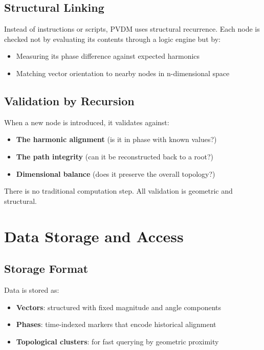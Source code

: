 \documentclass[12pt,a4paper]{article}
\begin{document}
\subsection{Structural Linking}

Instead of instructions or scripts, PVDM uses structural recurrence. Each node is checked not by evaluating its contents through a logic engine but by:

\begin{itemize}
    \item Measuring its phase difference against expected harmonics
    \item Matching vector orientation to nearby nodes in n-dimensional space
\end{itemize}

\subsection{Validation by Recursion}

When a new node is introduced, it validates against:

\begin{itemize}
    \item \textbf{The harmonic alignment} (is it in phase with known values?)
    \item \textbf{The path integrity} (can it be reconstructed back to a root?)
    \item \textbf{Dimensional balance} (does it preserve the overall topology?)
\end{itemize}

There is no traditional computation step. All validation is geometric and structural.

\section{Data Storage and Access}

\subsection{Storage Format}

Data is stored as:

\begin{itemize}
    \item \textbf{Vectors}: structured with fixed magnitude and angle components
    \item \textbf{Phases}: time-indexed markers that encode historical alignment
    \item \textbf{Topological clusters}: for fast querying by geometric proximity
\end{itemize}
\end{document}
